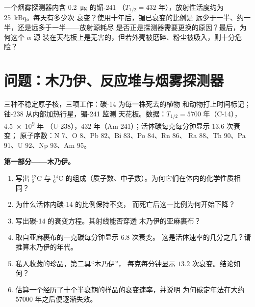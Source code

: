 \begin{exercise}[$\star\star\star$]\label{exo:g11:nucleus-radioactivity:15}
一个烟雾探测器内含 \qty{0.2}{\micro\gram} 的镅-241
（$T_{1/2} = 432$ 年），放射性活度约为 \qty{25}{kBq}。每天有多少次
衰变？使用十年后，镅已衰变的比例是
远少于一半、约一半，还是远多于一半——放射源耗尽
是否正是探测器需要更换的原因？最后，为何这个 $\alpha$ 源
装在天花板上是无害的，但若外壳被磨碎、粉尘被吸入，则十分危险？
\end{exercise}

\section{问题：木乃伊、反应堆与烟雾探测器}

\begin{problem}
\label{pb:g11:nucleus-radioactivity:1}
三种不稳定原子核，三项工作：碳-14 为每一株死去的植物
和动物打上时间标记；铀-238 从内部加热行星，镅-241 监测
天花板。数据：$T_{1/2} = \num{5700}$ 年（C-14），\num{4.5e9} 年
（U-238），$432$ 年（Am-241）；活体碳每克每分钟显示 $13.6$ 次衰变；
原子序数：N $7$、O $8$、Pb $82$、Bi $83$、Po $84$、Rn $86$、
Ra $88$、Th $90$、Pa $91$、U $92$、Np $93$、Am $95$。

\medskip
\noindent\textbf{第一部分——木乃伊。}
\begin{enumerate}
  \item 写出 ${}^{12}_{6}\mathrm{C}$ 与
        ${}^{14}_{6}\mathrm{C}$ 的组成（质子数、中子数）。为何它们在体内的化学性质相同？
  \item 为什么活体内碳-14 的比例保持不变，
        而死亡后这一比例为何开始下降？
  \item 写出碳-14 的衰变方程。其射线能否穿透
        木乃伊的亚麻裹布？
  \item 取自亚麻裹布的一克碳每分钟显示 $6.8$ 次衰变。
        这是活体速率的几分之几？请推算木乃伊的年代。
  \item 私人收藏的珍品，第二具“木乃伊”，
        每克每分钟显示 $13.2$ 次衰变。结论如何？
  \item 估算一个经历了十个半衰期的样品的衰变速率，并说明
        为何碳定年法在大约 \num{57000} 年之后便逐渐失效。
\end{enumerate}


\end{problem}
